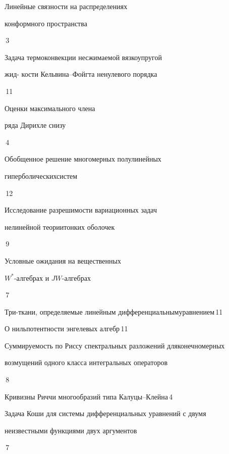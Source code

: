 

{Линейные связности на распределениях  


конформного пространства}{\No\,3}




{Задача термоконвекции несжимаемой вязкоупругой


жид- \newline кости Кельвина--Фойгта ненулевого порядка}{\No\,11}




{Оценки максимального члена


ряда Дирихле снизу}{\No\,4}




{Обобщенное решение многомерных полулинейных


гиперболических\newline систем}{\No\,12}




{Исследование разрешимости вариационных задач 


нелинейной теории\newline тонких оболочек}{\No\,9}




{Условные ожидания на вещественных  


$W^*$-алгебрах и $JW$-алгебрах}{\No\,7}




{Три-ткани, определяемые линейным дифференциальным\newline уравнением}{\No\,11}




{О нильпотентности энгелевых алгебр}{\No\,11}




{Суммируемость по Риссу спектральных разложений для\newline конечномерных


возмущений одного класса интегральных операторов}{\No\,8}




{Кривизны Риччи многообразий типа Калуцы--Клейна}{\No\,4}




{Задача Коши для системы дифференциальных уравнений с двумя \newline


неизвестными функциями двух аргументов}{\No\,7}


